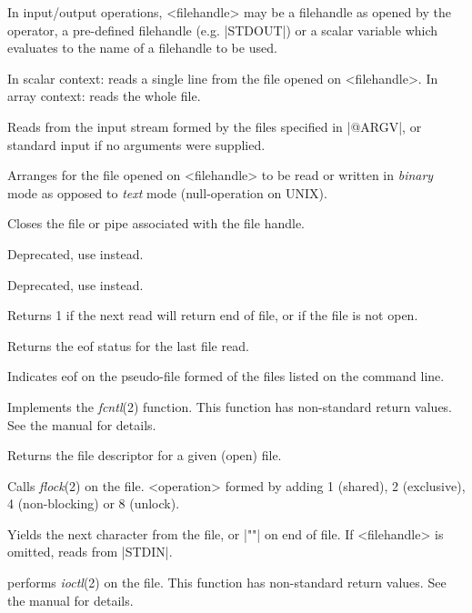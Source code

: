\documentclass{refbase}
\begin{document}
In input/output operations, <filehandle> may be a filehandle as opened
by the  operator, a pre-defined filehandle (e.g. |STDOUT|)
or a scalar variable which evaluates to the name of a filehandle to be
used.

\begin{enum}{1cm}

In scalar context: reads a single line from the file opened on <filehandle>. 
In array context: reads the whole file.

\Xi{\<\,\>}
Reads from the input stream formed by the files specified in
|@ARGV|, or standard input if no arguments were supplied.

Arranges for the file opened on <filehandle> to be read or written in
\textit{binary} mode as opposed to \textit{text} mode (null-operation on UNIX).

Closes the file or pipe associated with the file handle.

Deprecated, use  instead.

Deprecated, use  instead.

Returns 1 if the next read will return end of file, or if the file is
not open. 

Returns the eof status for the last file read.

Indicates eof on the pseudo-file formed of the files listed on the
command line. 

Implements the {\it fcntl\/}(2) function. This function has non-standard
return values. See the manual for details. 

Returns the file descriptor for a given (open) file.

Calls {\it flock\/}(2) on the file. <operation> formed by adding 1 (shared), 2
(exclusive), 4 (non-blocking) or 8 (unlock). 


Yields the next character from the file, or |""| on end of file.
\newline If <filehandle> is omitted, reads from |STDIN|. 

performs {\it ioctl}(2) on the file. This function has non-standard
return values. See the manual for details. 


\end{enum}
\end{document}

